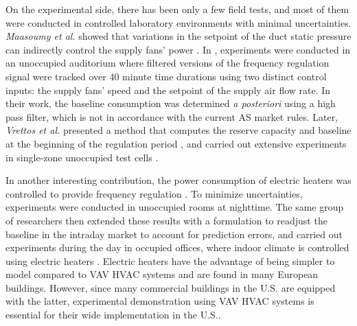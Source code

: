 On the experimental side, there has been only a few field tests, and most of them were conducted in controlled laboratory environments with minimal uncertainties.
\textit{Maasoumy et al.} showed that variations in the setpoint of the duct static pressure can indirectly control the supply fans' power \cite{Maasoumy:2014exp}. %
In \cite{Lin:2015exp}, experiments were conducted in an unoccupied auditorium where filtered versions of the frequency regulation signal were tracked over 40 minute time durations using two distinct control inputs: the supply fans' speed and the setpoint of the supply air flow rate. 
In their work, the baseline consumption was determined \textit{a posteriori} using a high pass filter, which is not in accordance with the current AS market rules.
Later, \textit{Vrettos et al.} presented a method that computes the reserve capacity and baseline at the beginning of the regulation period \cite{Vrettos:2016flexlab1}, and carried out extensive experiments in single-zone unoccupied test cells \cite{Vrettos:2016flexlab2}.

In another interesting contribution, the power consumption of electric heaters was %
controlled to provide frequency regulation \cite{Fabietti:2016exp}. 
To minimize uncertainties, experiments were conducted in unoccupied rooms at nighttime.
The same group of researchers then extended these results with a formulation to readjust the baseline in the intraday market to account for prediction errors, and carried out experiments during the day in occupied offices, where indoor climate is controlled using electric heaters \cite{Gorecki:2017exp}.
Electric heaters have the advantage of being simpler to model compared to VAV HVAC systems and are found in many European buildings.
However, since many commercial buildings in the U.S. are equipped with the latter, experimental demonstration using VAV HVAC systems is essential for their wide implementation in the U.S..



